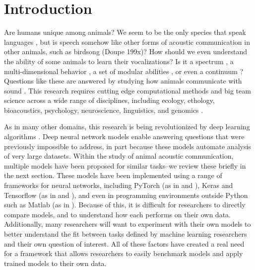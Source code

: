 \section{Introduction \label{sec:intro}}

Are humans unique among animals? We seem to be the only species that speak languages \cite{hauserFacultyLanguageWhat2002},
but is speech somehow like other forms of acoustic communication in other animals, such as birdsong (Doupe 199x)? How should we even understand the ability of some animals to learn their vocalizations? Is it a spectrum \cite{petkovBirdsPrimatesSpoken2012}, a multi-dimensional behavior \cite{vernesMultidimensionalNatureVocal2021}, a set of modular abilities \cite{wirthlinModularApproachVocal2019}, or even a continuum \cite{martinsSoundProductionLearning2020, martinsVocalLearningContinuum2020}? Questions like these are answered by studying how animals communicate with sound \cite{hopp2012animal}. This research requires cutting edge computational methods and big team science across a wide range of disciplines, including ecology, ethology, bioacoustics, psychology, neuroscience, linguistics, and genomics \cite{sainburgComputationalNeuroethologyVocal2021, stowellComputationalBioacousticsDeep2022, wirthlinModularApproachVocal2019, hauserFacultyLanguageWhat2002}.

As in many other domains, this research is being revolutionized by deep learning algorithms \cite{sainburgComputationalNeuroethologyVocal2021, stowellComputationalBioacousticsDeep2022}. Deep neural network models enable answering questions that were previously impossible to address, in part because these models automate analysis of very large datasets. Within the study of animal acoustic communication, multiple models have been proposed for similar tasks--we review these briefly in the next section. These models have been implemented using a range of frameworks for neural networks, including PyTorch (as in \cite{cohenAutomatedAnnotationBirdsong2022} and \cite{goffinetLowdimensionalLearnedFeature2021}), Keras and Tensorflow (as in \cite{steinfathFastAccurateAnnotation2021} and \cite{sainburgFindingVisualizingQuantifying2020}), and even in programming environments outside Python such as Matlab (as in \cite{coffeyDeepSqueakDeepLearningbased2019}). Because of this, it is difficult for researchers to directly compare models, and to understand how each performs on their own data.
Additionally, many researchers will want to experiment with their own models to better understand the fit between tasks defined by machine learning researchers and their own question of interest. All of these factors have created a real need for a framework that allows researchers to easily benchmark models and apply trained models to their own data.

